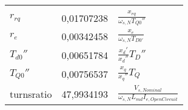 \begin{longtable}[]{@{}lll@{}}
\begin{minipage}[t]{0.55\columnwidth}
\end{minipage}\tabularnewline
\begin{minipage}[t]{0.10\columnwidth}\raggedright
\(r_{rq}\)\strut
\end{minipage} & \begin{minipage}[t]{0.25\columnwidth}\raggedright
0,01707238\strut
\end{minipage} & \begin{minipage}[t]{0.55\columnwidth}\raggedright
\(\frac{x_{rq}}{\omega_{s,N}T_{Q0}''}\)\strut
\end{minipage}\tabularnewline
\begin{minipage}[t]{0.10\columnwidth}\raggedright
\(r_e\)\strut
\end{minipage} & \begin{minipage}[t]{0.25\columnwidth}\raggedright
0,00342458\strut
\end{minipage} & \begin{minipage}[t]{0.55\columnwidth}\raggedright
\(\frac{x_e}{\omega_{s,N}T_{D0'}}\)\strut
\end{minipage}\tabularnewline
\begin{minipage}[t]{0.10\columnwidth}\raggedright
\(T_{d0}''\)\strut
\end{minipage} & \begin{minipage}[t]{0.25\columnwidth}\raggedright
0,00651784\strut
\end{minipage} & \begin{minipage}[t]{0.55\columnwidth}\raggedright
\(\frac{x_d'}{x_d''}T_D''\)\strut
\end{minipage}\tabularnewline
\begin{minipage}[t]{0.10\columnwidth}\raggedright
\(T_{Q0}''\)\strut
\end{minipage} & \begin{minipage}[t]{0.25\columnwidth}\raggedright
0,00756537\strut
\end{minipage} & \begin{minipage}[t]{0.55\columnwidth}\raggedright
\(\frac{x_q}{x_q''}T_Q\)\strut
\end{minipage}\tabularnewline
\begin{minipage}[t]{0.10\columnwidth}\raggedright
turnsratio\strut
\end{minipage} & \begin{minipage}[t]{0.25\columnwidth}\raggedright
47,9934193\strut
\end{minipage} & \begin{minipage}[t]{0.55\columnwidth}\raggedright
\(\frac{V_{s,Nominal}}{\omega_{s,N}L_{md}I_{e,OpenCircuit}}\)\strut
\end{minipage}\tabularnewline
\bottomrule
\end{longtable}

